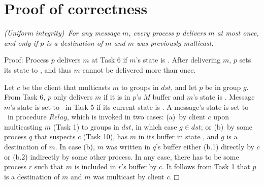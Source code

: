 
\newcommand{\Pend}{\ensuremath{\mathit{ToOrder}}\xspace}
\newcommand{\Done}{\ensuremath{\mathit{Ordered}}\xspace}
\newcommand{\Decided}{\ensuremath{\mathit{Decided}}\xspace}
\newcommand{\Buffer}{\ensuremath{\mathcal{B}}\xspace}

\clearpage
\section{Proof of correctness}

\begin{proposition}
\textit{(Uniform integrity)~For any message $m$, every process $p$ delivers $m$ at most once, and only if $p$ is a destination of $m$ and $m$ was previously multicast.}
\end{proposition}
\vspace{2mm}
\noindent
{\sc Proof:} 
Process $p$ delivers $m$ at Task 6 if $m$'s state is \ordered. 
After delivering $m$, $p$ sets its state to \done, and thus $m$ cannot be delivered more than once.

Let $c$ be the client that multicasts $m$ to groups in $dst$, and let $p$ be in group $g$. 
From Task 6, $p$ only delivers $m$ if it is in $p$'s $M$ buffer and $m$'s state is \ordered. 
Message $m$'s state is set to \ordered\ in Task 5 if its current state is \mcast.
A message's state is set to \mcast\ in procedure $Relay$, which is invoked in two cases:
(a)~by client $c$ upon multicasting $m$ (Task 1) to groups in $dst$, in which case $g \in dst$; or 
(b)~by some process $q$ that suspects $c$ (Task 10), has $m$ in its buffer in state \mcast, and $g$ is a destination of $m$.
In case (b), $m$ was written in $q$'s buffer either (b.1) directly by $c$ or (b.2) indirectly by some other process.
In any case, there has to be some process $r$ such that $m$ is included in $r$'s buffer by $c$.
It follows from Task 1 that $p$ is a destination of $m$ and $m$ was multicast by client $c$.\hfill$\Box$

